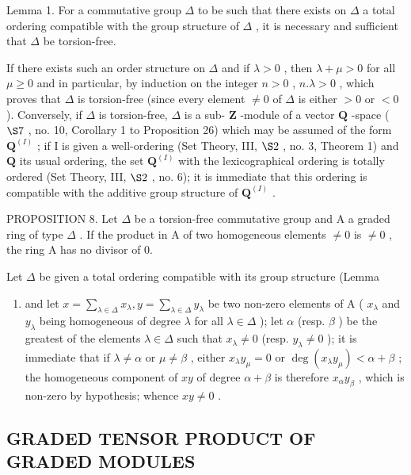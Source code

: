 Lemma 1. For a commutative group \(\Delta\) to be such that there exists on \(\Delta\) a total ordering compatible with the group structure of \(\Delta\) , it is necessary and sufficient that \(\Delta\) be torsion-free.

If there exists such an order structure on \(\Delta\) and if \(\lambda > 0\) , then \(\lambda + \mu > 0\) for all \(\mu \geqslant 0\) and in particular, by induction on the integer \(n > 0\) , \(n.\lambda > 0\) , which proves that \(\Delta\) is torsion-free (since every element \(\neq 0\) of \(\Delta\) is either \(>0\) or \(< 0\) ). Conversely, if \(\Delta\) is torsion-free, \(\Delta\) is a sub- \(\mathbf{Z}\) -module of a vector \(\mathbf{Q}\) -space ( \(\S 7\) , no. 10, Corollary 1 to Proposition 26) which may be assumed of the form \(\mathbf{Q}^{(I)}\) ; if I is given a well-ordering (Set Theory, III, \(\S 2\) , no. 3, Theorem 1) and \(\mathbf{Q}\) its usual ordering, the set \(\mathbf{Q}^{(I)}\) with the lexicographical ordering is totally ordered (Set Theory, III, \(\S 2\) , no. 6); it is immediate that this ordering is compatible with the additive group structure of \(\mathbf{Q}^{(I)}\) .

PROPOSITION 8. Let \(\Delta\) be a torsion-free commutative group and A a graded ring of type \(\Delta\) . If the product in A of two homogeneous elements \(\neq 0\) is \(\neq 0\) , the ring A has no divisor of 0.

Let \(\Delta\) be given a total ordering compatible with its group structure (Lemma

\begin{enumerate}
\def\labelenumi{\arabic{enumi})}
\tightlist
\item
  and let \(x = \sum_{\lambda \in \Delta} x_{\lambda}, y = \sum_{\lambda \in \Delta} y_{\lambda}\) be two non-zero elements of A ( \(x_{\lambda}\) and \(y_{\lambda}\) being homogeneous of degree \(\lambda\) for all \(\lambda \in \Delta\) ); let \(\alpha\) (resp. \(\beta\) ) be the greatest of the elements \(\lambda \in \Delta\) such that \(x_{\lambda} \neq 0\) (resp. \(y_{\lambda} \neq 0\) ); it is immediate that if \(\lambda \neq \alpha\) or \(\mu \neq \beta\) , either \(x_{\lambda}y_{\mu} = 0\) or \(\deg(x_{\lambda}y_{\mu}) < \alpha + \beta\) ; the homogeneous component of \(xy\) of degree \(\alpha + \beta\) is therefore \(x_{\alpha}y_{\beta}\) , which is non-zero by hypothesis; whence \(xy \neq 0\) .
\end{enumerate}

\subsection{GRADED TENSOR PRODUCT OF GRADED MODULES}

